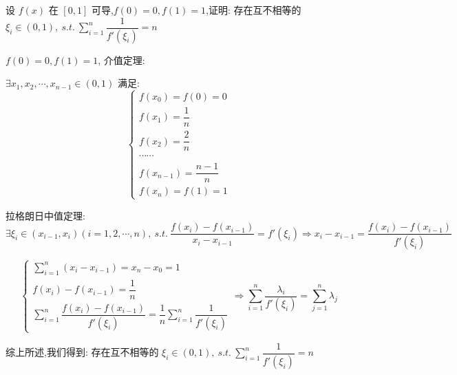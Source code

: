 \begin{proposition}
	设 $f(x)$ 在 $[0,1]$ 可导,$f(0)=0,f(1)=1$,证明: 存在互不相等的 $\xi_{i}\in(0,1),\ s.t.\ \sum\limits_{i=1}^{n}\dfrac{1}{f'(\xi_{i})}=n$
\end{proposition}
\begin{solution}

	$f(0)=0,f(1)=1$, 介值定理:

	$\exists x_{1},x_{2},\cdots,x_{n-1}\in(0,1)$ 满足:
	$$\begin{cases}
		f(x_{0}) = f(0) = 0\\
		f(x_{1})=\dfrac{1}{n}             \\
		f(x_{2})=\dfrac{2}{n} \\
		\cdots\cdots                                                                         \\
		f(x_{n-1})=\dfrac{n-1}{n}\\
		f(x_{n}) = f(1) = 1
	\end{cases}$$

	拉格朗日中值定理:
	$$\exists \xi_{i}\in(x_{i-1},x_{i})(i=1,2,\cdots,n),\ s.t.\ \dfrac{f(x_{i})-f(x_{i-1})}{x_{i}-x_{i-1}} = f'(\xi_{i})\Rightarrow x_{i} - x_{i-1} = \dfrac{f(x_{i})-f(x_{i-1})}{f'(\xi_{i})}$$
	
	$$\begin{cases}
		\sum\limits_{i=1}^{n}(x_{i}-x_{i-1}) = x_{n}-x_{0} =1\\
		f(x_{i})-f(x_{i-1})= \dfrac{1}{n}\\
		\sum\limits_{i=1}^{n}\dfrac{f(x_{i})-f(x_{i-1})}{f'(\xi_{i})} = \dfrac{1}{n}\sum\limits_{i=1}^{n}\dfrac{1}{f'(\xi_{i})}
	\end{cases}\Rightarrow
	\sum\limits_{i=1}^{n}\dfrac{\lambda_{i}}{f'(\xi_{i})} = \sum\limits_{j=1}^{n}\lambda_{j}
	$$

	综上所述,我们得到: 存在互不相等的 $\xi_{i}\in(0,1),\ s.t.\ \sum\limits_{i=1}^{n}\dfrac{1}{f'(\xi_{i})}=n$
\end{solution}

